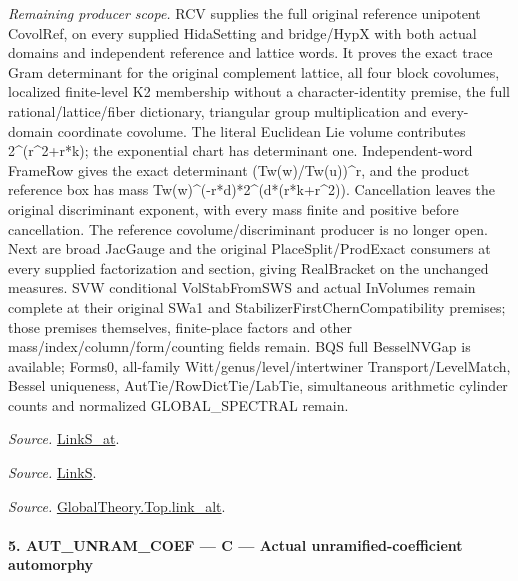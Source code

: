 \emph{Remaining producer scope.} RCV supplies the full original reference unipotent CovolRef, on every supplied HidaSetting and bridge/HypX with both actual domains and independent reference and lattice words. It proves the exact trace Gram determinant for the original complement lattice, all four block covolumes, localized finite-level K2 membership without a character-identity premise, the full rational/lattice/fiber dictionary, triangular group multiplication and every-domain coordinate covolume. The literal Euclidean Lie volume contributes 2\textasciicircum{}(r\textasciicircum{}2+r*k); the exponential chart has determinant one. Independent-word FrameRow gives the exact determinant (Tw(w)/Tw(u))\textasciicircum{}r, and the product reference box has mass Tw(w)\textasciicircum{}(-r*d)*2\textasciicircum{}(d*(r*k+r\textasciicircum{}2)). Cancellation leaves the original discriminant exponent, with every mass finite and positive before cancellation. The reference covolume/discriminant producer is no longer open. Next are broad JacGauge and the original PlaceSplit/ProdExact consumers at every supplied factorization and section, giving RealBracket on the unchanged measures. SVW conditional VolStabFromSWS and actual InVolumes remain complete at their original SWa1 and StabilizerFirstChernCompatibility premises; those premises themselves, finite-place factors and other mass/index/column/form/counting fields remain. BQS full BesselNVGap is available; Forms0, all-family Witt/genus/level/intertwiner Transport/LevelMatch, Bessel uniqueness, AutTie/RowDictTie/LabTie, simultaneous arithmetic cylinder counts and normalized GLOBAL\_\allowbreak SPECTRAL remain.

\emph{Source.} \href{https://github.com/CocoSgt/riemann-hypothesis-lean/blob/7cbf7a0c32fca1badf05931879a37c3f8a2b03b4/src/Formalism/SharpRestriction/GlobalTheoremInputs.lean#L145-L149}{LinkS\_\allowbreak at}.

\emph{Source.} \href{https://github.com/CocoSgt/riemann-hypothesis-lean/blob/7cbf7a0c32fca1badf05931879a37c3f8a2b03b4/src/Formalism/SharpRestriction/GlobalTheoremInputs.lean#L152-L157}{LinkS}.

\emph{Source.} \href{https://github.com/CocoSgt/riemann-hypothesis-lean/blob/7cbf7a0c32fca1badf05931879a37c3f8a2b03b4/src/Development/AbelianVarietyTheory/Proofs/GlobalInterpolation/LinkAlt.lean#L16-L50}{GlobalTheory.Top.link\_\allowbreak alt}.



\paragraph{5. AUT\_\allowbreak UNRAM\_\allowbreak COEF — C — Actual unramified-coefficient automorphy}

